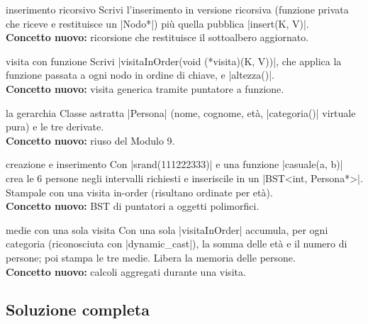 \begin{step}{inserimento ricorsivo}
Scrivi l'inserimento in versione ricorsiva (funzione privata che riceve e restituisce un
\cc|Nodo*|) più quella pubblica \cc|insert(K, V)|.\\[0.3em]
\textbf{Concetto nuovo:} ricorsione che restituisce il sottoalbero aggiornato.
\end{step}

\begin{step}{visita con funzione}
Scrivi \cc|visitaInOrder(void (*visita)(K, V))|, che applica la funzione passata a ogni
nodo in ordine di chiave, e \cc|altezza()|.\\[0.3em]
\textbf{Concetto nuovo:} visita generica tramite puntatore a funzione.
\end{step}

\begin{step}{la gerarchia}
Classe astratta \cc|Persona| (nome, cognome, età, \cc|categoria()| virtuale pura) e le
tre derivate.\\[0.3em]
\textbf{Concetto nuovo:} riuso del Modulo 9.
\end{step}

\begin{step}{creazione e inserimento}
Con \cc|srand(111222333)| e una funzione \cc|casuale(a, b)| crea le 6 persone negli
intervalli richiesti e inseriscile in un \cc|BST<int, Persona*>|. Stampale con una visita
in-order (risultano ordinate per età).\\[0.3em]
\textbf{Concetto nuovo:} BST di puntatori a oggetti polimorfici.
\end{step}

\begin{step}{medie con una sola visita}
Con una sola \cc|visitaInOrder| accumula, per ogni categoria (riconosciuta con
\cc|dynamic_cast|), la somma delle età e il numero di persone; poi stampa le tre medie.
Libera la memoria delle persone.\\[0.3em]
\textbf{Concetto nuovo:} calcoli aggregati durante una visita.
\end{step}

\subsection*{Soluzione completa}

